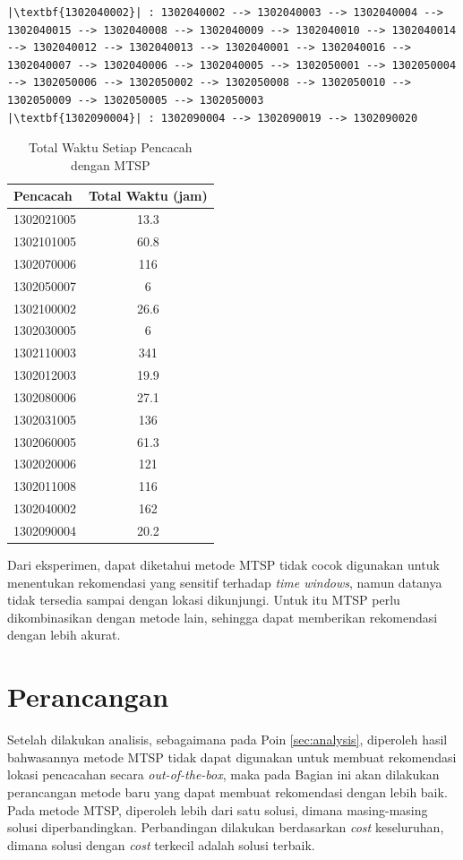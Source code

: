\begin{listing}
\begin{verbatim}
|\textbf{1302040002}| : 1302040002 --> 1302040003 --> 1302040004 --> 1302040015 --> 1302040008 --> 1302040009 --> 1302040010 --> 1302040014 --> 1302040012 --> 1302040013 --> 1302040001 --> 1302040016 --> 1302040007 --> 1302040006 --> 1302040005 --> 1302050001 --> 1302050004 --> 1302050006 --> 1302050002 --> 1302050008 --> 1302050010 --> 1302050009 --> 1302050005 --> 1302050003
|\textbf{1302090004}| : 1302090004 --> 1302090019 --> 1302090020
	\end{verbatim}
\end{listing}


\begin{table}
	\centering
	\caption{Total Waktu Setiap Pencacah dengan MTSP}
	\label{tbl:enumerators_total_time}
	\begin{tabular}{lc}
		\toprule
			Pencacah & Total Waktu (jam)\\
		\midrule
			1302021005 & 13.3\\
			1302101005 & 60.8\\
			1302070006 & 116\\
			1302050007 & 6\\
			1302100002 & 26.6\\
			1302030005 & 6\\
			1302110003 & 341\\
			1302012003 & 19.9\\
			1302080006 & 27.1\\
			1302031005 & 136\\
			1302060005 & 61.3\\
			1302020006 & 121\\
			1302011008 & 116\\
			1302040002 & 162\\
			1302090004 & 20.2\\
		\bottomrule
	\end{tabular}
\end{table}


Dari eksperimen, dapat diketahui metode MTSP tidak cocok digunakan untuk menentukan rekomendasi yang sensitif terhadap \textit{time windows}, namun datanya tidak tersedia sampai dengan lokasi dikunjungi. Untuk itu MTSP perlu dikombinasikan dengan metode lain, sehingga dapat memberikan rekomendasi dengan lebih akurat.


\section{Perancangan}
Setelah dilakukan analisis, sebagaimana pada Poin \ref{sec:analysis}, diperoleh hasil bahwasannya metode MTSP tidak dapat digunakan untuk membuat rekomendasi lokasi pencacahan secara \textit{out-of-the-box}, maka pada Bagian ini akan dilakukan perancangan metode baru yang dapat membuat rekomendasi dengan lebih baik. Pada metode MTSP, diperoleh lebih dari satu solusi, dimana masing-masing solusi diperbandingkan. Perbandingan dilakukan berdasarkan \textit{cost} keseluruhan, dimana solusi dengan \textit{cost} terkecil adalah solusi terbaik.


